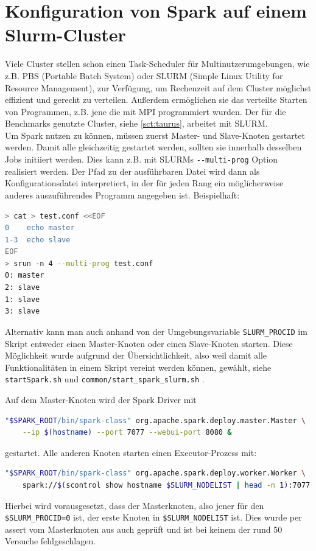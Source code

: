 \section{Konfiguration von Spark auf einem Slurm-Cluster}
\label{sct:sparkconfig}

Viele Cluster stellen schon einen Task-Scheduler für Multinutzerumgebungen, wie z.B. PBS (Portable Batch System) oder SLURM (Simple Linux Utility for Resource Management), zur Verfügung, um Rechenzeit auf dem Cluster möglichst effizient und gerecht zu verteilen.
Außerdem ermöglichen sie das verteilte Starten von Programmen, z.B. jene die mit MPI programmiert wurden.
Der für die Benchmarks genutzte Cluster, siehe \autoref{sct:taurus}, arbeitet mit SLURM.\\

Um Spark nutzen zu können, müssen zuerst Master- und Slave-Knoten gestartet werden.
Damit alle gleichzeitig gestartet werden, sollten sie innerhalb desselben Jobs initiiert werden.
Dies kann z.B. mit SLURMs \lstinline!--multi-prog! Option realisiert werden. Der Pfad zu der ausführbaren Datei wird dann als Konfigurationsdatei interpretiert, in der für jeden Rang ein möglicherweise anderes auszuführendes Programm angegeben ist. Beispielhaft:
\begin{lstlisting}[language=Bash]
> cat > test.conf <<EOF
0    echo master
1-3  echo slave
EOF
> srun -n 4 --multi-prog test.conf
0: master
2: slave
1: slave
3: slave
\end{lstlisting}\vspace{-1.5\baselineskip}

Alternativ kann man auch anhand von der Umgebungsvariable \lstinline!SLURM_PROCID! im Skript entweder einen Master-Knoten oder einen Slave-Knoten starten.
Diese Möglichkeit wurde aufgrund der Übersichtlichkeit, also weil damit alle Funktionalitäten in einem Skript vereint werden können, gewählt, siehe \lstinline!startSpark.sh! und \lstinline!common/start_spark_slurm.sh! \cite{scaromare}.

Auf dem Master-Knoten wird der Spark Driver mit
\begin{lstlisting}[language=Bash]
"$SPARK_ROOT/bin/spark-class" org.apache.spark.deploy.master.Master \
    --ip $(hostname) --port 7077 --webui-port 8080 &
\end{lstlisting}\vspace{-1.5\baselineskip}
gestartet.
Alle anderen Knoten starten einen Executor-Prozess mit:
\begin{lstlisting}[language=Bash]
"$SPARK_ROOT/bin/spark-class" org.apache.spark.deploy.worker.Worker \
    spark://$(scontrol show hostname $SLURM_NODELIST | head -n 1):7077
\end{lstlisting}\vspace{-1.5\baselineskip}
Hierbei wird vorausgesetzt, dass der Masterknoten, also jener für den \lstinline!$SLURM_PROCID=0! ist, der erste Knoten in \lstinline!$SLURM_NODELIST! ist. Dies wurde per assert vom Masterknoten aus auch geprüft und ist bei keinem der rund 50 Versuche fehlgeschlagen.

